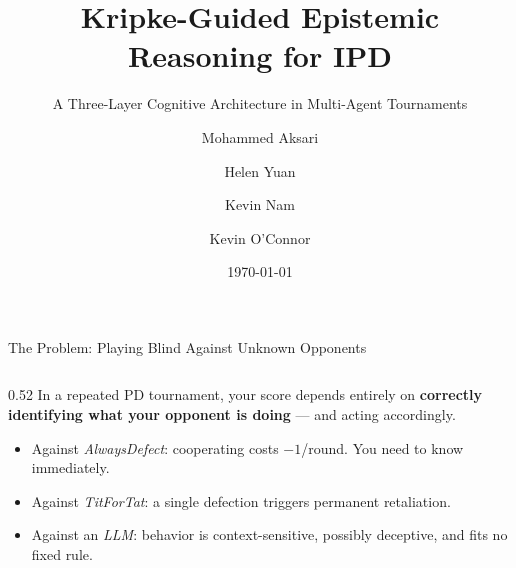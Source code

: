 \documentclass[aspectratio=169, 10pt]{beamer}
\title{Kripke-Guided Epistemic Reasoning for IPD}
\subtitle{A Three-Layer Cognitive Architecture in Multi-Agent Tournaments}
\author{Mohammed Aksari \and Helen Yuan \and Kevin Nam \and Kevin O'Connor}
\institute{Stats C163/263 --- Generative Data Science}
\date{\today}
\begin{document}
\begin{frame}[plain]
    \titlepage
\end{frame}

\begin{frame}{The Problem: Playing Blind Against Unknown Opponents}

    \begin{columns}[T]
        \begin{column}{0.52\textwidth}
            In a repeated PD tournament, your score depends entirely on
            \textbf{correctly identifying what your opponent is doing} --- and acting accordingly.

            \vspace{0.4cm}
            \begin{itemize}
                \setlength\itemsep{8pt}
                \item Against \textit{AlwaysDefect}: cooperating costs $-1$/round. You need to know immediately.
                \item Against \textit{TitForTat}: a single defection triggers permanent retaliation.
                \item Against an \textit{LLM}: behavior is context-sensitive, possibly deceptive, and fits no fixed rule.
            \end{itemize}


\end{column}
\end{columns}
\end{frame}
\end{document}
